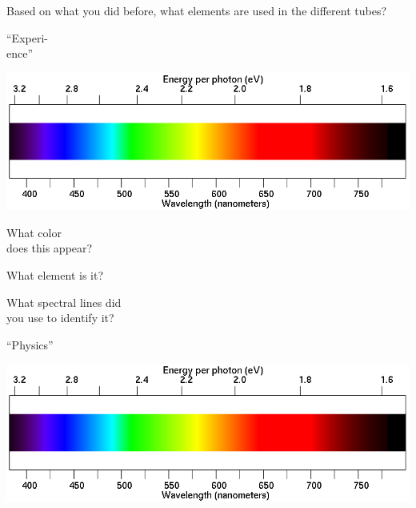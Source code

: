 \documentclass[11pt]{article}
\begin{document}
Based on what you
did before, what elements are used in the different tubes?

\begin{minipage}{0.1\textwidth}
	\begin{center}
		``Experi-\\ence''
	\end{center}
\end{minipage}
\begin{minipage}{0.8\textwidth}
	\includegraphics[width=\textwidth]{spectrum2.png}
\end{minipage}


\begin{minipage}{0.33\textwidth}
	What color \\does this appear?
\end{minipage}
\begin{minipage}{0.33\textwidth}
	What element is it?
\end{minipage}
\begin{minipage}{0.33\textwidth}
	What spectral lines did\\
	you use to identify it?
\end{minipage}

\vspace{1.2in}



\begin{minipage}{0.1\textwidth}
	\begin{center}
		\large ``Physics''
	\end{center}
\end{minipage}
\begin{minipage}{0.8\textwidth}
	\includegraphics[width=\textwidth]{spectrum2.png}
\end{minipage}
\end{document}
